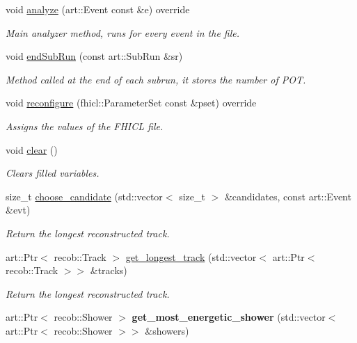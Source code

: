 \begin{DoxyCompactItemize}
\item 
void \hyperlink{group__lee_gab6142fdaa2037d01df2304cbb17d59b0}{analyze} (art\-::\-Event const \&e) override
\begin{DoxyCompactList}\small\item\em Main analyzer method, runs for every event in the file. \end{DoxyCompactList}\item 
void \hyperlink{group__lee_gaede981b7ff7b78309f2457c40581ba71}{end\-Sub\-Run} (const art\-::\-Sub\-Run \&sr)
\begin{DoxyCompactList}\small\item\em Method called at the end of each subrun, it stores the number of P\-O\-T. \end{DoxyCompactList}\item 
void \hyperlink{group__lee_ga4696139a07194b86735e93fe0d9df45e}{reconfigure} (fhicl\-::\-Parameter\-Set const \&pset) override
\begin{DoxyCompactList}\small\item\em Assigns the values of the F\-H\-I\-C\-L file. \end{DoxyCompactList}\item 
\hypertarget{group__lee_ga9d8072bae8c7e78701c093070d17c992}{void \hyperlink{group__lee_ga9d8072bae8c7e78701c093070d17c992}{clear} ()}\label{group__lee_ga9d8072bae8c7e78701c093070d17c992}

\begin{DoxyCompactList}\small\item\em Clears filled variables. \end{DoxyCompactList}\item 
size\-\_\-t \hyperlink{group__lee_ga2598c705e4307eed73e1989613028ced}{choose\-\_\-candidate} (std\-::vector$<$ size\-\_\-t $>$ \&candidates, const art\-::\-Event \&evt)
\begin{DoxyCompactList}\small\item\em Return the longest reconstructed track. \end{DoxyCompactList}\item 
art\-::\-Ptr$<$ recob\-::\-Track $>$ \hyperlink{group__lee_gae76ba045ee298f69ff19ab86be51a69e}{get\-\_\-longest\-\_\-track} (std\-::vector$<$ art\-::\-Ptr$<$ recob\-::\-Track $>$$>$ \&tracks)
\begin{DoxyCompactList}\small\item\em Return the longest reconstructed track. \end{DoxyCompactList}\item 
\hypertarget{group__lee_gaf6eb7dd67f871231011dbfae2dcf6cfc}{art\-::\-Ptr$<$ recob\-::\-Shower $>$ {\bfseries get\-\_\-most\-\_\-energetic\-\_\-shower} (std\-::vector$<$ art\-::\-Ptr$<$ recob\-::\-Shower $>$$>$ \&showers)}\label{group__lee_gaf6eb7dd67f871231011dbfae2dcf6cfc}


\end{DoxyCompactItemize}
